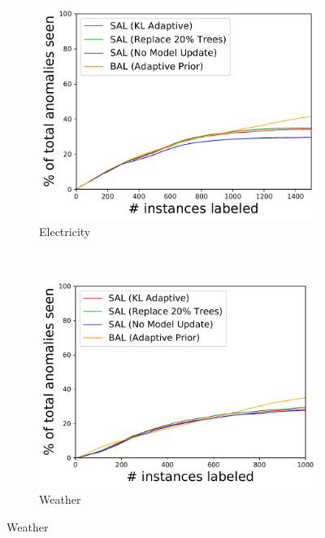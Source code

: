 \documentclass{article} %
\begin{document}
\begin{figure}
\begin{subfigure}[b]{0.3\textwidth}
    	\includegraphics[width=\textwidth]{figures/num_seen-electricity}
    	\caption{Electricity}
    	\label{fig:concept_drift_electricity_num}
    \end{subfigure}
    ~ %
    \begin{subfigure}[b]{0.3\textwidth}
    	\includegraphics[width=\textwidth]{figures/num_seen-weather}
    	\caption{Weather}
    	\label{fig:concept_drift_weather_num}
    \end{subfigure}

\end{figure}
\end{document}
